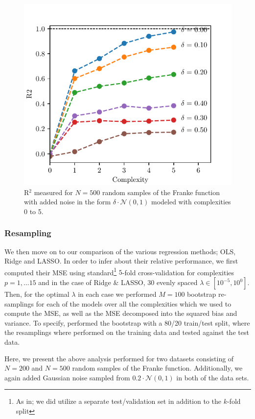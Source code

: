 \documentclass[reprint, english, nofootinbib]{revtex4-2}
\begin{document}
\begin{figure}[h!tb]
    \center
    \includegraphics[width=\columnwidth]{OLS_R2_noise.pdf}
    \caption{R$^2$ measured for $N=500$ random samples of the Franke function with added noise in the form $\delta\cdot\mathcal N(0, 1)$ modeled with complexities 0 to 5.}
    \label{fig:r2_vs_noise}
\end{figure}


\subsubsection{Resampling}
\noindent
We then move on to our comparison of the various regression methods; OLS, Ridge and LASSO. In order to infer about their relative performance, we first computed their MSE using standard\footnote{As in; we did utilize a separate test/validation set in addition to the $k$-fold split} $5$-fold cross-validation for complexities $p=1, \dots 15$ and in the case of Ridge \& LASSO, 30 evenly spaced $\lambda \in [10^{-5}, 10^{0}]$. Then, for the optimal $\lambda$ in each case we performed $M=100$ bootstrap re-samplings for each of the models over all the complexities which we used to compute the MSE, as well as the MSE decomposed into the squared bias and variance. To specify, performed the bootstrap with a 80/20 train/test split, where the resamplings where performed on the training data and tested against the test data.

Here, we present the above analysis performed for two datasets consisting of $N=200$ and $N=500$ random samples of the Franke function. Additionally, we again added Gaussian noise sampled from $0.2 \cdot \mathcal N(0,1)$ in both of the data sets.
\end{document}
